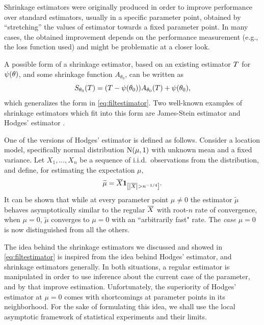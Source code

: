 \documentclass[ejs, twoside]{imsart}
\theoremstyle{plain}
\theoremstyle{remark}
\newcommand{\fullstop}{\text{.}}
\newcommand{\comma}{\text{,}}
\numberwithin{equation}{section}
\numberwithin{table}{section}
\numberwithin{figure}{section}
\let\originalleft\left
\let\originalright\right
\renewcommand{\left}{\mathopen{}\mathclose\bgroup\originalleft}
\renewcommand{\right}{\aftergroup\egroup\originalright}
\begin{document}
Shrinkage estimators were originally produced in order to improve performance over standard estimators, usually in a specific parameter point, obtained by ``stretching'' the values of estimator towards a fixed parameter point. In many cases, the obtained improvement depends on the performance measurement (e.g., the loss function used) and might be problematic at a closer look.

A possible form of a shrinkage estimator, based on an existing estimator \(\basestat\) for \(\psi\left( \theta \right) \), and some shrinkage function \(A_{\theta_0}\), can be written as
\begin{equation} \label{eq:shrinkage}
	S_{\theta_0}\left(T\right) = \left(T - \psi\left(\theta_0 \right)  \right) A_{\theta_0}\left(T\right)  + \psi\left(\theta_0 \right) \comma
\end{equation}
which generalizes the form in \eqref{eq:filtestimator}. Two well-known examples of shrinkage estimators which fit into this form are James-Stein estimator \citep{kotz_estimation_1992} and Hodges' estimator \citep{le_cam_asymptotic_1953, van_der_vaart_asymptotic_1998}.

One of the versions of Hodges' estimator is defined as follows. Consider a location model, specifically normal distribution \(\nordist[\mu][1]\) with unknown mean and a fixed variance. Let $X_1,\dots,X_n$ be a sequence of i.i.d.\ observations from the distribution, and define, for estimating the expectation $\mu$,
\begin{equation} \label{eq:hodges}
	\widetilde{\mu} = \avg{X} \indc{\left| \avg{X}\right| >n^{-1/4}} \fullstop
\end{equation}
It can be shown \citep{van_der_vaart_asymptotic_1998} that while at every parameter point \(\mu \neq 0\) the estimator \(\widetilde{\mu}\) behaves asymptotically similar to the regular \(\overline{X}\) with root-\(n\) rate of convergence, when \(\mu = 0\), \(\widetilde{\mu}\) converges to \(\mu = 0\) with an ``arbitrarily fast" rate. The \emph{case} \(\mu = 0\) is now distinguished from all the others.

The idea behind the shrinkage estimators we discussed and showed in \eqref{eq:filtestimator} is inspired from the idea behind Hodges' estimator, and shrinkage estimators generally. In both situations, a regular estimator is manipulated in order to use inference about the current case of the parameter, and by that improve estimation. 
Unfortunately, the superiority of Hodges' estimator at $\mu=0$ comes with shortcomings at parameter points in its neighborhood. For the sake of formulating this idea, we shall use the local asymptotic framework of statistical experiments and their limits.
\end{document}
